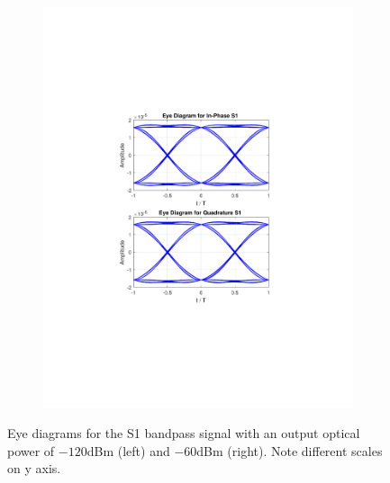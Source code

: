 \begin{figure}[h]
\begin{subfigure}{.5\textwidth}
		\includegraphics[clip, trim=5cm 7cm 5cm 7cm, width=\textwidth]{./sdf/m_qam_system/figures/eye60db09ro.pdf}
	\end{subfigure}
	\caption{Eye diagrams for the S1 bandpass signal with an output optical power of $-120$dBm (left) and $-60$dBm (right). Note different scales on y axis.}
	\label{fig:test}
\end{figure}

